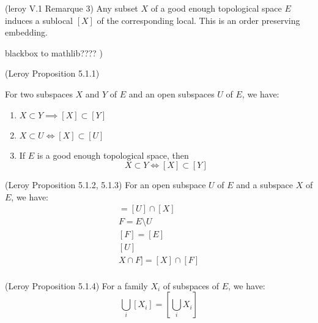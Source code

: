 \begin{lemma}
(leroy V.1 Remarque 3)
    \label{lem:subset_sublocal}
    Any subset $X$ of a good enough topological space $E$ induces a sublocal $[X]$ of the corresponding local. This is an order preserving embedding.
\end{lemma}

\begin{definition}
    \label{def:good_enough_topological_space}
    blackbox to mathlib???? )
\end{definition}

\begin{lemma}
(Leroy Proposition 5.1.1)
    \label{lem:subset_to_sublocal_part_1}

    For two subspaces $X$ and $Y$ of $E$ and an open subspaces $U$ of $E$, we have:
    \begin{enumerate}
        \item $X \subset Y \implies [X] \subset [Y]$
        \item $X \subset U \iff [X] \subset [U]$
        \item If $E$ is a good enough topological space, then \[X \subset Y \iff [X] \subset [Y]\]
    \end{enumerate}
\end{lemma}

\begin{lemma}
(Leroy Proposition 5.1.2, 5.1.3)
    \label{lem:subset_to_sublocal_part_2}
    For an open subspace $U$ of $E$ and a subspace $X$ of $E$, we have:
    \begin{gather*}
        [U \cap X] = [U] \cap [X]\\
        F = E \setminus U\\
        [F] = [E] \\ [U]\\
        X \cap F] = [X] \cap [F]\\
    \end{gather*}

\end{lemma}

\begin{lemma}
(Leroy Proposition 5.1.4)
    \label{lem:unions_of_subspaces}
    For a family $X_i$ of subspaces of $E$, we have:
    \[\bigcup_i [X_i] = [\bigcup_i X_i]\]
\end{lemma}

